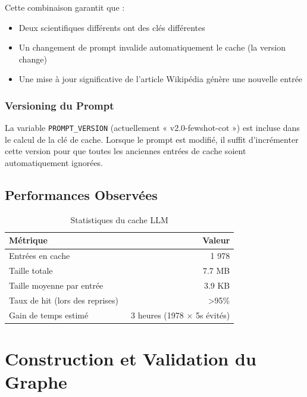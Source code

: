 \documentclass[12pt,a4paper]{report}
\begin{document}
Cette combinaison garantit que :
\begin{itemize}
    \item Deux scientifiques différents ont des clés différentes
    \item Un changement de prompt invalide automatiquement le cache (la version change)
    \item Une mise à jour significative de l'article Wikipédia génère une nouvelle entrée
\end{itemize}

\subsection{Versioning du Prompt}

La variable \texttt{PROMPT\_VERSION} (actuellement « v2.0-fewshot-cot ») est incluse dans le calcul de la clé de cache. Lorsque le prompt est modifié, il suffit d'incrémenter cette version pour que toutes les anciennes entrées de cache soient automatiquement ignorées.

\section{Performances Observées}

\begin{table}[H]
\centering
\begin{tabular}{|l|r|}
\hline
\rowcolor{ice500!20}
\textbf{Métrique} & \textbf{Valeur} \\
\hline
Entrées en cache & 1 978 \\
\hline
Taille totale & 7.7 MB \\
\hline
Taille moyenne par entrée & 3.9 KB \\
\hline
Taux de hit (lors des reprises) & >95\% \\
\hline
Gain de temps estimé & ~3 heures (1978 × 5s évités) \\
\hline
\end{tabular}
\caption{Statistiques du cache LLM}
\end{table}

\chapter{Construction et Validation du Graphe}
\end{document}
